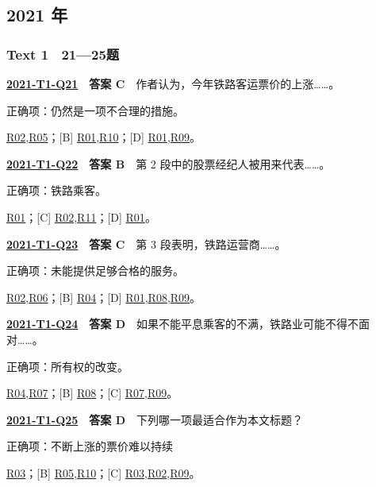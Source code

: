 \documentclass[11pt,a4paper]{article}
\begin{document}
\subsection{2021 年}\label{year-2021}
\subsubsection{Text 1　21—25题}
\label{idx-2021-T1-Q21}
\noindent\textbf{\href{https://zj139.github.io/math-notes/english/dd6c1ad7c3eee43811c958d2/\#q21}{2021-T1-Q21}　答案 C}　作者认为，今年铁路客运票价的上涨……。\par\nopagebreak
\noindent 正确项：仍然是一项不合理的措施。\par\nopagebreak
\noindent [A] \hyperref[cat-R02]{R02},\hyperref[cat-R05]{R05}；[B] \hyperref[cat-R01]{R01},\hyperref[cat-R10]{R10}；[D] \hyperref[cat-R01]{R01},\hyperref[cat-R09]{R09}。
\par\smallskip
{}\label{idx-2021-T1-Q22}
\noindent\textbf{\href{https://zj139.github.io/math-notes/english/dd6c1ad7c3eee43811c958d2/\#q22}{2021-T1-Q22}　答案 B}　第 2 段中的股票经纪人被用来代表……。\par\nopagebreak
\noindent 正确项：铁路乘客。\par\nopagebreak
\noindent [A] \hyperref[cat-R01]{R01}；[C] \hyperref[cat-R02]{R02},\hyperref[cat-R11]{R11}；[D] \hyperref[cat-R01]{R01}。
\par\smallskip
{}\label{idx-2021-T1-Q23}
\noindent\textbf{\href{https://zj139.github.io/math-notes/english/dd6c1ad7c3eee43811c958d2/\#q23}{2021-T1-Q23}　答案 C}　第 3 段表明，铁路运营商……。\par\nopagebreak
\noindent 正确项：未能提供足够合格的服务。\par\nopagebreak
\noindent [A] \hyperref[cat-R02]{R02},\hyperref[cat-R06]{R06}；[B] \hyperref[cat-R04]{R04}；[D] \hyperref[cat-R01]{R01},\hyperref[cat-R08]{R08},\hyperref[cat-R09]{R09}。
\par\smallskip
{}\label{idx-2021-T1-Q24}
\noindent\textbf{\href{https://zj139.github.io/math-notes/english/dd6c1ad7c3eee43811c958d2/\#q24}{2021-T1-Q24}　答案 D}　如果不能平息乘客的不满，铁路业可能不得不面对……。\par\nopagebreak
\noindent 正确项：所有权的改变。\par\nopagebreak
\noindent [A] \hyperref[cat-R04]{R04},\hyperref[cat-R07]{R07}；[B] \hyperref[cat-R08]{R08}；[C] \hyperref[cat-R07]{R07},\hyperref[cat-R09]{R09}。
\par\smallskip
{}\label{idx-2021-T1-Q25}
\noindent\textbf{\href{https://zj139.github.io/math-notes/english/dd6c1ad7c3eee43811c958d2/\#q25}{2021-T1-Q25}　答案 D}　下列哪一项最适合作为本文标题？\par\nopagebreak
\noindent 正确项：不断上涨的票价难以持续\par\nopagebreak
\noindent [A] \hyperref[cat-R03]{R03}；[B] \hyperref[cat-R05]{R05},\hyperref[cat-R10]{R10}；[C] \hyperref[cat-R03]{R03},\hyperref[cat-R02]{R02},\hyperref[cat-R09]{R09}。
\par\smallskip
\end{document}
